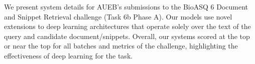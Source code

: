 We present system details for AUEB's submissions to the BioASQ 6 Document and Snippet Retrieval challenge (Task 6b Phase A). Our models use novel extensions to deep learning architectures that operate solely over the text of the query and candidate document/snippets. Overall, our systems scored at the top or near the top for all batches and metrics of the challenge, highlighting the effectiveness of deep learning for the task.
